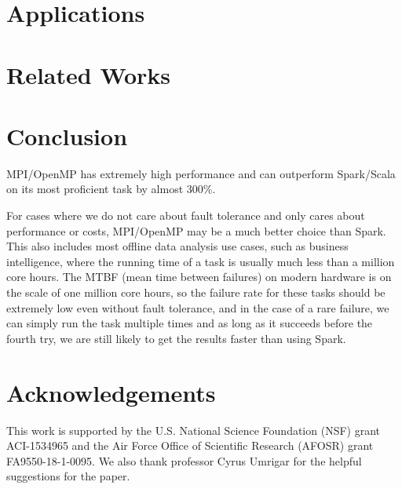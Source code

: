 \documentclass{sigkddExp}
\begin{document}
\section{Applications}

\section{Related Works}

\section{Conclusion}

MPI/OpenMP has extremely high performance and can outperform Spark/Scala on its most proficient task by almost 300\%.

For cases where we do not care about fault tolerance and only cares about performance or costs, MPI/OpenMP may be a much better choice than Spark. This also includes most offline data analysis use cases, such as business intelligence, where the running time of a task is usually much less than a million core hours. The MTBF (mean time between failures) on modern hardware is on the scale of one million core hours, so the failure rate for these tasks should be extremely low even without fault tolerance, and in the case of a rare failure, we can simply run the task multiple times and as long as it succeeds before the fourth try, we are still likely to get the results faster than using Spark.



\section{Acknowledgements}
This work is supported by the U.S. National Science Foundation (NSF) grant ACI-1534965 and the Air Force Office of Scientific Research (AFOSR) grant FA9550-18-1-0095.
We also thank professor Cyrus Umrigar for the helpful suggestions for the paper.
\end{document}
